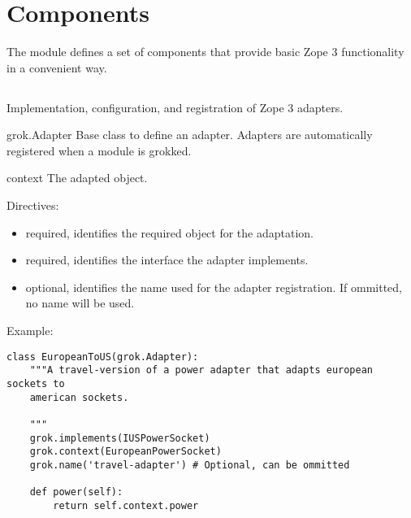 \chapter{Components}

The  module defines a set of components that provide basic Zope 3
functionality in a convenient way.

\section{}

    Implementation, configuration, and registration of Zope 3 adapters.

    \begin{classdesc*}{grok.Adapter}
        Base class to define an adapter. Adapters are automatically registered
        when a module is grokked.

        \begin{memberdesc}{context}
            The adapted object.
        \end{memberdesc}

    \begin{bf}Directives:\end{bf}

    \begin{itemize}
        \item[\function{grok.context(context_obj)}] required, identifies the required object for the
        adaptation.

        \item[\function{grok.implements(interface)}] required, identifies the interface the adapter implements.

        \item[\function{grok.name(name)}] optional, identifies the name used for the adapter
        registration. If ommitted, no name will be used.
    \end{itemize}
    \end{classdesc*}

    \begin{bf}Example:\end{bf}

    \begin{verbatim}
class EuropeanToUS(grok.Adapter):
    """A travel-version of a power adapter that adapts european sockets to
    american sockets.

    """
    grok.implements(IUSPowerSocket)
    grok.context(EuropeanPowerSocket)
    grok.name('travel-adapter') # Optional, can be ommitted

    def power(self):
        return self.context.power
    \end{verbatim}


